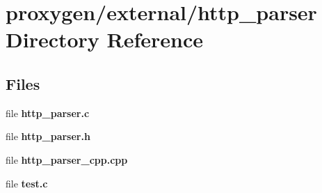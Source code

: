 \section{proxygen/external/http\+\_\+parser Directory Reference}
\label{dir_f9f7bdc818d47d797af1c7f6d2bba958}
\subsection*{Files}
\begin{DoxyCompactItemize}
\item 
file {\bf http\+\_\+parser.\+c}
\item 
file {\bf http\+\_\+parser.\+h}
\item 
file {\bf http\+\_\+parser\+\_\+cpp.\+cpp}
\item 
file {\bf test.\+c}
\end{DoxyCompactItemize}
